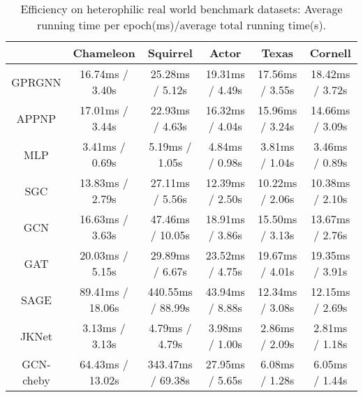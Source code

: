 \documentclass{article} \usepackage{iclr2021_conference,times}
\begin{document}
\begin{table}[ht]
\caption{Efficiency on heterophilic real world benchmark datasets: Average running time per epoch(ms)/average total running time(s).}
\small
\label{tab:my-table}
\begin{tabular}{@{}cccccc@{}}
\toprule
          & Chameleon      & Squirrel        & Actor         & Texas         & Cornell       \\ \midrule
GPRGNN    & 16.74ms / 3.40s  & 25.28ms / 5.12s   & 19.31ms / 4.49s & 17.56ms / 3.55s & 18.42ms / 3.72s \\
APPNP     & 17.01ms / 3.44s  & 22.93ms / 4.63s   & 16.32ms / 4.04s & 15.96ms / 3.24s & 14.66ms / 3.09s \\
MLP       & 3.41ms / 0.69s   & 5.19ms / 1.05s    & 4.84ms / 0.98s  & 3.81ms / 1.04s  & 3.46ms / 0.89s  \\
SGC       & 13.83ms / 2.79s  & 27.11ms / 5.56s   & 12.39ms / 2.50s & 10.22ms / 2.06s & 10.38ms / 2.10s \\
GCN       & 16.63ms / 3.63s  & 47.46ms / 10.05s  & 18.91ms / 3.86s & 15.50ms / 3.13s & 13.67ms / 2.76s \\
GAT       & 20.03ms / 5.15s  & 29.89ms / 6.67s   & 23.52ms / 4.75s & 19.67ms / 4.01s & 19.35ms / 3.91s \\
SAGE      & 89.41ms / 18.06s & 440.55ms / 88.99s & 43.94ms / 8.88s & 12.34ms / 3.08s & 12.15ms / 2.69s \\
JKNet     & 3.13ms / 3.13s   & 4.79ms / 4.79s    & 3.98ms / 1.00s  & 2.86ms / 2.09s  & 2.81ms / 1.18s  \\
GCN-cheby & 64.43ms / 13.02s & 343.47ms / 69.38s & 27.95ms / 5.65s & 6.08ms / 1.28s  & 6.05ms / 1.44s  \\ \bottomrule
\end{tabular}
\normalsize
\end{table}
\end{document}

